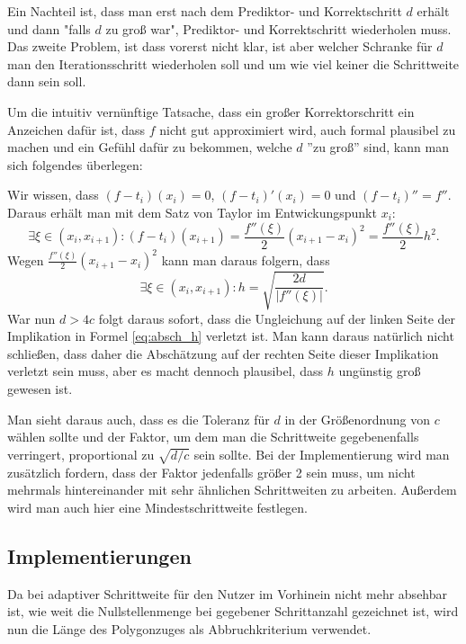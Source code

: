 \documentclass[a4paper,11pt,bibliography=totoc,listof=totoc,headinclude=true,cleardoublepage=empty,oneside]{scrartcl}
\begin{document}
Ein Nachteil ist, dass man erst nach dem Prediktor- und Korrektschritt $d$ erhält und dann "falls $d$ zu groß war", Prediktor- und Korrektschritt wiederholen muss. Das zweite Problem, ist dass vorerst nicht klar, ist aber welcher Schranke für $d$ man den Iterationsschritt wiederholen soll und um wie viel keiner die Schrittweite dann sein soll.

Um die intuitiv vernünftige Tatsache, dass ein großer Korrektorschritt ein Anzeichen dafür ist, dass $f$ nicht gut approximiert wird, auch formal plausibel zu machen und ein Gefühl dafür zu bekommen, welche $d$ ''zu groß'' sind, kann man sich folgendes überlegen:

Wir wissen, dass $(f-t_i)(x_i)=0$, $(f-t_i)'(x_i)=0$ und $(f-t_i)''=f''$. Daraus erhält man mit dem Satz von Taylor im Entwickungspunkt $x_i$:
\[
\exists \xi \in (x_i,x_{i+1}) : (f-t_i)(x_{i+1}) = \frac{f''(\xi)}{2}(x_{i+1}-x_i)^2 = \frac{f''(\xi)}{2}h^2.
\]
Wegen $\frac{f''(\xi)}{2}(x_{i+1}-x_i)^2$ kann man daraus folgern, dass
\[
\exists \xi \in (x_i,x_{i+1}) : h = \sqrt{\frac{2d}{|f''(\xi)|}}.
\]
War nun $d > 4c$ folgt daraus sofort, dass die Ungleichung auf der linken Seite der Implikation in Formel \eqref{eq:absch_h} verletzt ist. Man kann daraus natürlich nicht schließen, dass daher die Abschätzung auf der rechten Seite dieser Implikation verletzt sein muss, aber es macht dennoch plausibel, dass $h$ ungünstig groß gewesen ist. 

Man sieht daraus auch, dass es die Toleranz für $d$ in der Größenordnung von $c$ wählen sollte und der Faktor, um dem man die Schrittweite gegebenenfalls verringert, proportional zu $\sqrt{d/c}$ sein sollte. Bei der Implementierung wird man zusätzlich fordern, dass der Faktor jedenfalls größer 2 sein muss, um nicht mehrmals hintereinander mit sehr ähnlichen Schrittweiten zu arbeiten. Außerdem wird man auch hier eine Mindestschrittweite festlegen.

\subsection{Implementierungen}
Da bei adaptiver Schrittweite für den Nutzer im Vorhinein nicht mehr absehbar ist, wie weit die Nullstellenmenge bei gegebener Schrittanzahl gezeichnet ist, wird nun die Länge des Polygonzuges als Abbruchkriterium verwendet.
\end{document}
